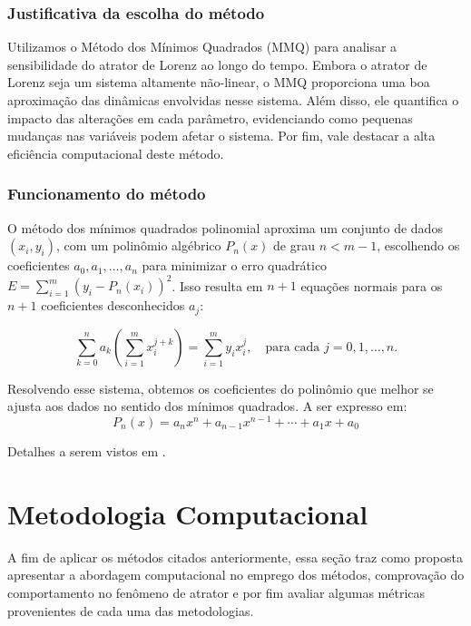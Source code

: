 \documentclass[12pt, a4paper]{article}
\begin{document}
    \subsubsection{Justificativa da escolha do método}
    Utilizamos o Método dos Mínimos Quadrados (MMQ) para analisar a
    sensibilidade do atrator de Lorenz ao longo do tempo. Embora o atrator de
    Lorenz seja um sistema altamente não-linear, o MMQ proporciona uma boa
    aproximação das dinâmicas envolvidas nesse sistema. Além disso, ele quantifica
    o impacto das alterações em cada parâmetro, evidenciando como pequenas mudanças
    nas variáveis podem afetar o sistema. Por fim, vale destacar a alta eficiência
    computacional deste método.
    
    \subsubsection{Funcionamento do método}
    O método dos mínimos quadrados polinomial aproxima um conjunto de dados
    $(x_i, y_i)$, com um polinômio algébrico $P_n(x)$ de grau $n < m - 1$,
    escolhendo os coeficientes $a_0, a_1, \ldots, a_n$ para minimizar o erro
    quadrático $E = \sum_{i=1}^m (y_i - P_n(x_i))^2$. Isso resulta em $n + 1$
    equações normais para os $n + 1$ coeficientes desconhecidos $a_j$:
    
    \begin{equation}
        \sum_{k=0}^n a_k \left(\sum_{i=1}^m x_i^{j+k}\right) = \sum_{i=1}^m y_i
        x_i^j, \quad \text{para cada } j = 0, 1, \ldots, n.
    \end{equation}
    
    Resolvendo esse sistema, obtemos os coeficientes do polinômio que melhor se
    ajusta aos dados no sentido dos mínimos quadrados. A ser expresso em:
    \begin{equation*}
        P_n(x) = a_nx^n + a_{n-1}x^{n-1} + \cdots + a_1x + a_0
    \end{equation*}
    
    Detalhes a serem vistos em \cite{burden2016}.
    \newpage
    
    
    
    \section{Metodologia Computacional}
    A fim de aplicar os métodos citados anteriormente, essa seção traz como
    proposta apresentar a abordagem computacional no emprego dos métodos,
    comprovação do comportamento no fenômeno de atrator e por fim avaliar algumas
    métricas provenientes de cada uma das metodologias.
    
\end{document}

